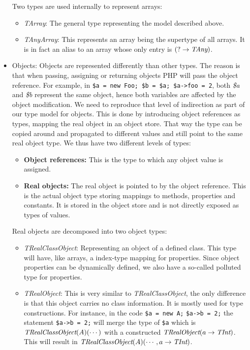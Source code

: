 \documentclass[a4paper]{article}
\begin{document}
\begin{itemize}
    Two types are used internally to represent arrays:
    \begin{itemize}
      \item \emph{TArray}: The general type representing the model described
        above.
      \item \emph{TAnyArray}: This represents an array being the
        supertype of all arrays. It is in fact an alias to an array whose
        only entry is $(? \rightarrow \emph{TAny})$.
    \end{itemize}
  \item Objects: Objects are represented differently than other types. The
    reason is that when passing, assigning or returning objects PHP will pass
    the object reference. For example, in 
    \verb/$a = new Foo; $b = $a; $a->foo = 2/, both \emph{\$a} and \emph{\$b}
    represent the same object, hence both variables are affected by the object
    modification. We need to reproduce that level of indirection as part of our
    type model for objects. This is done by introducing object references as
    types, mapping the real object in an object store. That way the type can
    be copied around and propagated to different values and still point to the
    same real object type. We thus have two different levels of types:
    \begin{itemize}
          \item \textbf{Object references:} This is the type to which
            any object value is assigned.
          \item \textbf{Real objects:} The real object is pointed to by the
            object reference. This is the actual object type storing mappings to
            methods, properties and constants. It is stored in the object store
            and is not directly exposed as types of values.
    \end{itemize}

    Real objects are decomposed into two object types:
    \begin{itemize}
          \item \emph{TRealClassObject}: Representing an object of a
            defined class. This type will have, like arrays, a index-type
            mapping for properties. Since object properties can be dynamically
            defined, we also have a so-called polluted type for properties.
          \item \emph{TRealObject}: This is very similar to
            \emph{TRealClassObject}, the only difference is that this object
            carries no class information. It is mostly used for type
            constructions. For instance, in the code
            \verb/$a = new A;/ \verb/$a->b = 2;/ the statement 
            \verb/$a->b = 2;/ will merge the type of \verb/$a/ which is
            $\emph{TRealClassObject}(A)(\cdots)$ with a constructed
            $\emph{TRealObject}(a \rightarrow \emph{TInt})$. This will result
            in  $\emph{TRealClassObject}(A)(\cdots, a \rightarrow
            \emph{TInt})$.
    \end{itemize}
\end{itemize}
\end{document}
